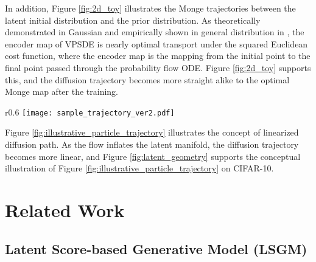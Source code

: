 \documentclass{article}
\theoremstyle{definition}
\theoremstyle{remark}
\begin{document}
	In addition, Figure \ref{fig:2d_toy} illustrates the Monge trajectories between the latent initial distribution and the prior distribution. As theoretically demonstrated in Gaussian and empirically shown in general distribution in \citet{khrulkov2022understanding}, the encoder map of VPSDE is nearly optimal transport under the squared Euclidean cost function, where the encoder map is the mapping from the initial point to the final point passed through the probability flow ODE. Figure \ref{fig:2d_toy} supports this, and the diffusion trajectory becomes more straight alike to the optimal Monge map after the training.
	
	\begin{wrapfigure}{r}{0.6\textwidth}
		\vskip -0.25in
		\centering
		\texttt{[image: sample\_trajectory\_ver2.pdf]}
		\vskip -0.05in
		\caption{Illustrative Particle Trajectory.}
		\label{fig:illustrative_particle_trajectory}
		\vskip -0.35in
	\end{wrapfigure}
	Figure \ref{fig:illustrative_particle_trajectory} illustrates the concept of linearized diffusion path. As the flow inflates the latent manifold, the diffusion trajectory becomes more linear, and Figure \ref{fig:latent_geometry} supports the conceptual illustration of Figure \ref{fig:illustrative_particle_trajectory} on CIFAR-10.
	
	\section{Related Work}\label{appendix:related_work_appendix}
	
	
	\subsection{Latent Score-based Generative Model (LSGM)}\label{appendix:LSGM}
	
\end{document}
